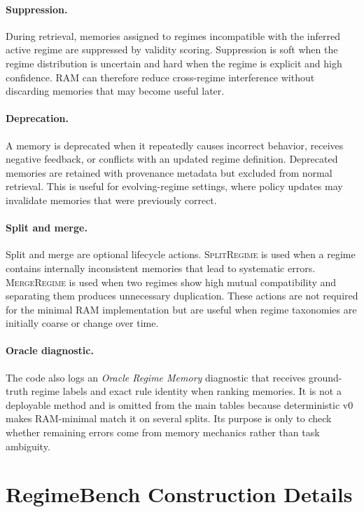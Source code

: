 \documentclass{article} %
\begin{document}
\paragraph{Suppression.}
During retrieval, memories assigned to regimes incompatible with the inferred active regime are suppressed by validity scoring.
Suppression is soft when the regime distribution is uncertain and hard when the regime is explicit and high confidence.
RAM can therefore reduce cross-regime interference without discarding memories that may become useful later.

\paragraph{Deprecation.}
A memory is deprecated when it repeatedly causes incorrect behavior, receives negative feedback, or conflicts with an updated regime definition.
Deprecated memories are retained with provenance metadata but excluded from normal retrieval.
This is useful for evolving-regime settings, where policy updates may invalidate memories that were previously correct.

\paragraph{Split and merge.}
Split and merge are optional lifecycle actions.
\textsc{SplitRegime} is used when a regime contains internally inconsistent memories that lead to systematic errors.
\textsc{MergeRegime} is used when two regimes show high mutual compatibility and separating them produces unnecessary duplication.
These actions are not required for the minimal RAM implementation but are useful when regime taxonomies are initially coarse or change over time.

\paragraph{Oracle diagnostic.}
The code also logs an \emph{Oracle Regime Memory} diagnostic that receives ground-truth regime labels and exact rule identity when ranking memories.
It is not a deployable method and is omitted from the main tables because deterministic v0 makes RAM-minimal match it on several splits.
Its purpose is only to check whether remaining errors come from memory mechanics rather than task ambiguity.

\section{RegimeBench Construction Details}
\label{app:regimebench_construction}
\end{document}
